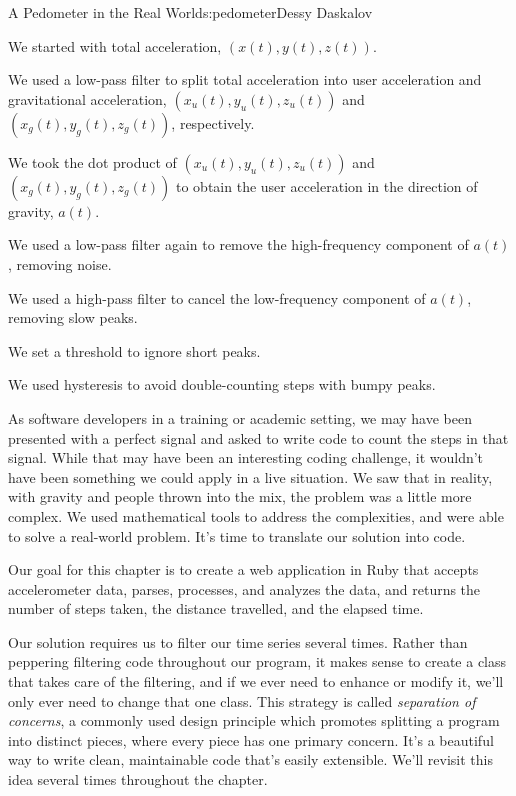 \begin{aosachapter}{A Pedometer in the Real World}{s:pedometer}{Dessy Daskalov}
\begin{aosaenumerate}
\def\labelenumi{\arabic{enumi}.}

\item
  We started with total acceleration, $(x(t), y(t), z(t))$.
\item
  We used a low-pass filter to split total acceleration into user
  acceleration and gravitational acceleration,
  $(x_{u}(t), y_{u}(t), z_{u}(t))$ and $(x_{g}(t), y_{g}(t), z_{g}(t))$,
  respectively.
\item
  We took the dot product of $(x_{u}(t), y_{u}(t), z_{u}(t))$ and
  $(x_{g}(t), y_{g}(t), z_{g}(t))$ to obtain the user acceleration in
  the direction of gravity, $a(t)$.
\item
  We used a low-pass filter again to remove the high-frequency component
  of $a(t)$, removing noise.
\item
  We used a high-pass filter to cancel the low-frequency component of
  $a(t)$, removing slow peaks.
\item
  We set a threshold to ignore short peaks.
\item
  We used hysteresis to avoid double-counting steps with bumpy peaks.
\end{aosaenumerate}

As software developers in a training or academic setting, we may have
been presented with a perfect signal and asked to write code to count
the steps in that signal. While that may have been an interesting coding
challenge, it wouldn't have been something we could apply in a live
situation. We saw that in reality, with gravity and people thrown into
the mix, the problem was a little more complex. We used mathematical
tools to address the complexities, and were able to solve a real-world
problem. It's time to translate our solution into code.

\label{diving-into-code}

Our goal for this chapter is to create a web application in Ruby that
accepts accelerometer data, parses, processes, and analyzes the data,
and returns the number of steps taken, the distance travelled, and the
elapsed time.

\label{preliminary-work}

Our solution requires us to filter our time series several times. Rather
than peppering filtering code throughout our program, it makes sense to
create a class that takes care of the filtering, and if we ever need to
enhance or modify it, we'll only ever need to change that one class.
This strategy is called \emph{separation of concerns}, a commonly used
design principle which promotes splitting a program into distinct
pieces, where every piece has one primary concern. It's a beautiful way
to write clean, maintainable code that's easily extensible. We'll
revisit this idea several times throughout the chapter.


\end{aosachapter}
